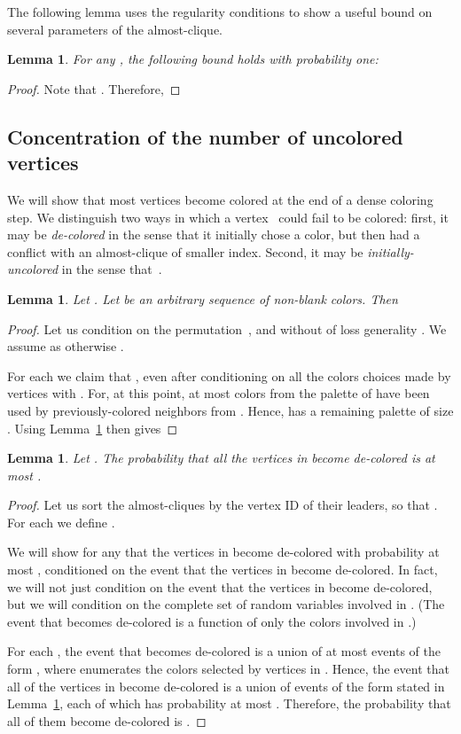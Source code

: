 \documentclass[11pt]{amsart}
\newtheorem{lemma}[theorem]{Lemma}
\begin{document}
The following lemma uses the regularity conditions to show a useful bound on several parameters of the almost-clique.
\begin{lemma}
\label{aprop1}
For any , the following bound holds with probability one:

\end{lemma}
\begin{proof}
Note that . Therefore,
{\allowdisplaybreaks

}
\end{proof}


\subsection{Concentration of the number of uncolored vertices}
We will show that most vertices become colored at the end of a dense coloring step. We distinguish two ways in which a vertex~ could fail to be colored: first, it may be \emph{de-colored} in the sense that it initially chose a color, but then had a conflict with an almost-clique of smaller index. Second, it may be \emph{initially-uncolored} in the sense that~.

\begin{lemma}
\label{color-lemma}
Let . Let  be an arbitrary sequence of non-blank colors. Then

\end{lemma}
\begin{proof}
Let us condition on the permutation~, and without of loss generality . We assume  as otherwise .

For each  we claim that , even after conditioning on all the colors choices made by vertices  with . For, at this point, at most  colors from the palette of  have been used by previously-colored neighbors from . Hence,  has a remaining palette of size . Using Lemma~\ref{aprop1} then gives

\end{proof}

\begin{lemma}
\label{prop1}
Let . The probability that all the vertices in  become de-colored is at most .
\end{lemma}
\begin{proof}
Let us sort the almost-cliques  by the vertex ID of their leaders, so that . For each  we define . 

We will show for any  that the vertices in  become de-colored with probability at most , conditioned on the event that the vertices in  become de-colored.  In fact, we will not just condition on the event that the vertices in  become de-colored, but we will condition on the complete set of random variables involved in . (The event that  becomes de-colored is a function of only the colors involved in .)

For each , the event that  becomes de-colored is a union of at most  events of the form , where  enumerates the colors selected by vertices in . Hence, the event that all of the vertices in  become de-colored is a union of  events of the form stated in Lemma~\ref{color-lemma}, each of which has probability at most . Therefore, the probability that all of them become de-colored is .
\end{proof}
\end{document}
